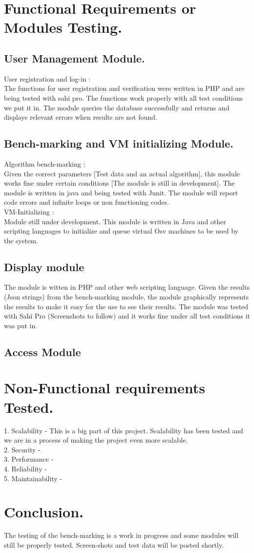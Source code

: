 \documentclass[runningheads,a4paper]{article}
\begin{document}
\section{Functional Requirements or Modules Testing.}
\raggedright{
\subsection{User Management Module.}
User registration and log-in : \\
The functions for user registration and verification were written in PHP and are being tested with sahi pro. The functions work properly with all test conditions we put it in. The module queries the database successfully and returns and displays relevant errors when results are not found.

\subsection{ Bench-marking and VM initializing Module.}
Algorithm bench-marking : \\
Given the correct parameters [Test data and an actual algorithm], this module works fine under certain conditions [The module is still in development].  The module is written in java and being tested with Junit. The module will report code errors and infinite loops or non functioning codes.\\
VM-Initializing : \\
{Module still under development. This module is written in Java and other scripting languages to initialize and queue virtual Osv machines to be used by the system.\\
}
\subsection{Display module}
\raggedright{
The module is witten in PHP and other web scripting language. Given the results (Json strings) from the bench-marking module, the module graphically represents the results to make it easy for the use to see their results. The module was tested with Sahi Pro (Screenshots to follow) and it works fine under all test conditions it was put in.\\
}

\subsection{Access Module}

}
\section{Non-Functional requirements Tested.}
\raggedright{
1. Scalability - This is a big part of this project. Scalability has been tested and we are in a process of making the project even more scalable.
\\2. Security - \\
3. Performance - \\
4. Reliability - \\
5. Maintainability - \\

}

\section{Conclusion.}
\raggedright{
The testing of the bench-marking is a work in progress and some modules will still be properly tested. Screen-shots and test data will be posted shortly.
}
\end{document}
